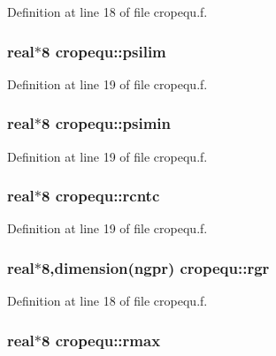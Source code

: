 Definition at line 18 of file cropequ.f.\hypertarget{namespacecropequ_39bc7b9e1955e30091891c1f2dbbea4d}{
\subsubsection[psilim]{\setlength{\rightskip}{0pt plus 5cm}real$\ast$8 {\bf cropequ::psilim}}}
\label{namespacecropequ_39bc7b9e1955e30091891c1f2dbbea4d}




Definition at line 19 of file cropequ.f.\hypertarget{namespacecropequ_226aa64e7824a43774d5758f1cbbfdc3}{
\subsubsection[psimin]{\setlength{\rightskip}{0pt plus 5cm}real$\ast$8 {\bf cropequ::psimin}}}
\label{namespacecropequ_226aa64e7824a43774d5758f1cbbfdc3}




Definition at line 19 of file cropequ.f.\hypertarget{namespacecropequ_847b9d7c0a63b3cf6f8c121587f8d128}{
\subsubsection[rcntc]{\setlength{\rightskip}{0pt plus 5cm}real$\ast$8 {\bf cropequ::rcntc}}}
\label{namespacecropequ_847b9d7c0a63b3cf6f8c121587f8d128}




Definition at line 19 of file cropequ.f.\hypertarget{namespacecropequ_78c5274a895c892c290855610e3fe6dd}{
\subsubsection[rgr]{\setlength{\rightskip}{0pt plus 5cm}real$\ast$8,dimension({\bf ngpr}) {\bf cropequ::rgr}}}
\label{namespacecropequ_78c5274a895c892c290855610e3fe6dd}




Definition at line 18 of file cropequ.f.\hypertarget{namespacecropequ_e0f2d36e258a08a73b6444150b9aac34}{
\subsubsection[rmax]{\setlength{\rightskip}{0pt plus 5cm}real$\ast$8 {\bf cropequ::rmax}}}
\label{namespacecropequ_e0f2d36e258a08a73b6444150b9aac34}




